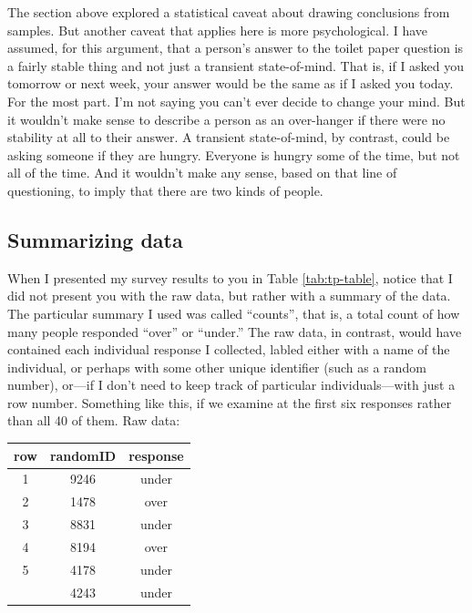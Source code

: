 \documentclass[
  openany]{book}
\begin{document}
The section above explored a statistical caveat about drawing conclusions from samples. But another caveat that applies here is more psychological. I have assumed, for this argument, that a person's answer to the toilet paper question is a fairly stable thing and not just a transient state-of-mind. That is, if I asked you tomorrow or next week, your answer would be the same as if I asked you today. For the most part. I'm not saying you can't ever decide to change your mind. But it wouldn't make sense to describe a person as an over-hanger if there were no stability at all to their answer. A transient state-of-mind, by contrast, could be asking someone if they are hungry. Everyone is hungry some of the time, but not all of the time. And it wouldn't make any sense, based on that line of questioning, to imply that there are two kinds of people.

\hypertarget{summarizing-data}{%
\subsection*{Summarizing data}\label{summarizing-data}}

When I presented my survey results to you in Table \ref{tab:tp-table}, notice that I did not present you with the raw data, but rather with a summary of the data. The particular summary I used was called ``counts'', that is, a total count of how many people responded ``over'' or ``under.'' The raw data, in contrast, would have contained each individual response I collected, labled either with a name of the individual, or perhaps with some other unique identifier (such as a random number), or---if I don't need to keep track of particular individuals---with just a row number. Something like this, if we examine at the first six responses rather than all 40 of them. Raw data:

\begin{table}[!h]
\centering
\begin{tabular}{ccc}
\toprule
row & randomID & response\\
\midrule
1 & 9246 & under\\
2 & 1478 & over\\
3 & 8831 & under\\
4 & 8194 & over\\
5 & 4178 & under\\
\addlinespace
6 & 4243 & under\\
\bottomrule
\end{tabular}
\end{table}
\end{document}
